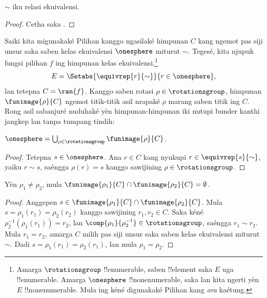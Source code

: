 \documentclass[../../../include/open-logic-section]{subfiles}
\begin{document}
\begin{lem}
$\sim$ iku relasi ekuivalensi.
\end{lem}

\begin{proof}
Cetha saka .
\end{proof}

Saiki kita migunakaké Pilihan kanggo ngasilaké himpunan $C$ kang
ngemot pas siji unsur saka saben kelas ekuivalensi $\onesphere$
miturut $\sim$. Tegesé, kita njupuk fungsi pilihan $f$ ing himpunan
kelas ekuivalensi,\footnote{Amarga $\rotationsgroup$ !!{enumerable},
saben !!{element} saka $E$ uga !!{enumerable}. Amarga $\onesphere$
!!{nonenumerable}, saka  lan
 kita ngerti yèn
$E$ !!{nonenumerable}. Mula ing kéné digunakaké Pilihan kang
\emph{ora} kaétung.}
\[
	E = \Setabs{\equivrep{r}{\sim}}{r \in \onesphere},
\]
lan tetepna $C = \ran{f}$. Kanggo saben rotasi
$\rho \in \rotationsgroup$, himpunan $\funimage{\rho}{C}$
ngemot titik-titik asil nrapaké $\rho$ marang saben titik ing $C$.
Rong asil sabanjuré nuduhaké yèn himpunan-himpunan iki nutupi
bunder kanthi jangkep lan tanpa tumpang tindih:

\begin{lem}
$\onesphere = \bigcup_{\rho \in \rotationsgroup} \funimage{\rho}{C}$.
\end{lem}

\begin{proof}
Tetepna $s \in \onesphere$. Ana $r \in C$ kang nyukupi
$r \in \equivrep{s}{\sim}$, yaiku $r \sim s$, saéngga
$\rho(r) = s$ kanggo sawijining $\rho \in \rotationsgroup$.
\end{proof}

\begin{lem}
Yèn $\rho_1 \neq \rho_2$, mula
$\funimage{\rho_1}{C} \cap \funimage{\rho_2}{C} = \emptyset$.
\end{lem}

\begin{proof}
Anggepen $s \in \funimage{\rho_{1}}{C} \cap
\funimage{\rho_{2}}{C}$. Mula
$s = \rho_{1}(r_{1}) = \rho_{2}(r_{2})$ kanggo sawijining
$r_{1}, r_{2} \in C$. Saka kéné
$\rho^{-1}_2(\rho_1(r_1)) = r_2$, lan
$\comp{\rho_1}{\rho^{-1}_2} \in \rotationsgroup$, saéngga
$r_{1} \sim r_{2}$. Mula $r_1 = r_2$, amarga $C$ milih pas siji
unsur saka saben kelas ekuivalensi miturut $\sim$.
Dadi $s = \rho_1(r_1) = \rho_2(r_1)$, lan mula
$\rho_1 = \rho_2$.
\end{proof}
\end{document}
